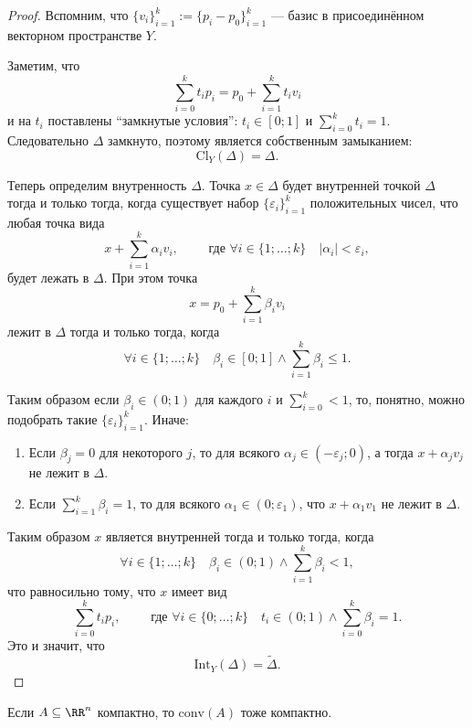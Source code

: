 \documentclass[12pt,a4paper]{article}
\newcommand{\Int}{\ensuremath{\mathrm{Int}}\xspace}
\newcommand{\Cl}{\ensuremath{\mathrm{Cl}}\xspace}
\newcommand{\conv}{\ensuremath{\mathrm{conv}}\xspace}
\begin{document}
    \begin{proof}
        Вспомним, что $\{v_i\}_{i=1}^k := \{p_i - p_0\}_{i=1}^k$ --- базис в присоединённом векторном пространстве $Y$.

        Заметим, что
        \[\sum_{i=0}^k t_i p_i = p_0 + \sum_{i=1}^k t_i v_i\]
        и на $t_i$ поставлены ``замкнутые условия'': $t_i \in [0; 1]$ и $\sum_{i=0}^k t_i = 1$. Следовательно $\Delta$ замкнуто, поэтому является собственным замыканием:
        \[\Cl_Y(\Delta) = \Delta.\]
        
        Теперь определим внутренность $\Delta$. Точка $x \in \Delta$ будет внутренней точкой $\Delta$ тогда и только тогда, когда существует набор $\{\varepsilon_i\}_{i=1}^k$ положительных чисел, что любая точка вида
        \[x + \sum_{i=1}^k \alpha_i v_i, \qquad \text{ где } \forall i \in \{1; \dots; k\}\quad |\alpha_i| < \varepsilon_i,\]
        будет лежать в $\Delta$. При этом точка
        \[x = p_0 + \sum_{i=1}^k \beta_i v_i\]
        лежит в $\Delta$ тогда и только тогда, когда
        \[\forall i \in \{1; \dots; k\} \quad \beta_i \in [0; 1] \wedge \sum_{i=1}^k \beta_i \leqslant 1.\]
        
        Таким образом если $\beta_i \in (0; 1)$ для каждого $i$ и $\sum_{i=0}^k < 1$, то, понятно, можно подобрать такие $\{\varepsilon_i\}_{i=1}^k$. Иначе:
        \begin{enumerate}
            \item Если $\beta_j = 0$ для некоторого $j$, то для всякого $\alpha_j \in (-\varepsilon_j; 0)$, а тогда $x + \alpha_j v_j$ не лежит в $\Delta$.
            \item Если $\sum_{i=1}^k \beta_i = 1$, то для всякого $\alpha_1 \in (0; \varepsilon_1)$, что $x + \alpha_1 v_1$ не лежит в $\Delta$.
        \end{enumerate}
        Таким образом $x$ является внутренней тогда и только тогда, когда
        \[\forall i \in \{1; \dots; k\} \quad \beta_i \in (0; 1) \wedge \sum_{i=1}^k \beta_i < 1,\]
        что равносильно тому, что $x$ имеет вид
        \[\sum_{i=0}^k t_i p_i, \qquad \text{ где } \forall i \in \{0; \dots; k\} \quad t_i \in (0; 1) \wedge \sum_{i=0}^k \beta_i = 1.\]
        Это и значит, что
        \[\Int_Y(\Delta) = \widetilde{\Delta}.\]
    \end{proof}

    \begin{theorem}
        Если $A \subseteq \RR^n$ компактно, то $\conv(A)$ тоже компактно.
    \end{theorem}
\end{document}
